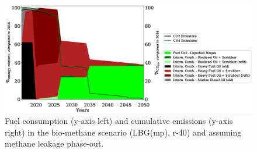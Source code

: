 \documentclass[article]{elsarticle}
\begin{document}
\begin{figure}[h]
    \centering
    \includegraphics[width=\textwidth]{figures/LBG_MP_fuels_emissions.eps}
    \caption{Fuel consumption (y-axis left) and cumulative emissions (y-axis right) in the bio-methane scenario (LBG(mp), r-40) and assuming methane leakage phase-out.}
    \label{fig:LBG}
\end{figure}
\end{document}
